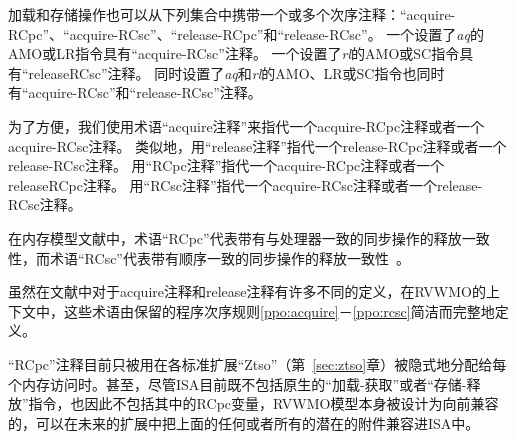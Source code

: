 加载和存储操作也可以从下列集合中携带一个或多个次序注释：“acquire-RCpc”、“acquire-RCsc”、“release-RCpc”和“release-RCsc”。
一个设置了{\em aq}的AMO或LR指令具有“acquire-RCsc”注释。
一个设置了{\em rl}的AMO或SC指令具有“releaseRCsc”注释。
同时设置了{\em aq}和{\em rl}的AMO、LR或SC指令也同时有“acquire-RCsc”和“release-RCsc”注释。

为了方便，我们使用术语“acquire注释”来指代一个acquire-RCpc注释或者一个acquire-RCsc注释。
类似地，用“release注释”指代一个release-RCpc注释或者一个release-RCsc注释。
用“RCpc注释”指代一个acquire-RCpc注释或者一个releaseRCpc注释。
用“RCsc注释”指代一个acquire-RCsc注释或者一个release-RCsc注释。

\begin{commentary}
  在内存模型文献中，术语“RCpc”代表带有与处理器一致的同步操作的释放一致性，而术语“RCsc”代表带有顺序一致的同步操作的释放一致性~\cite{Gharachorloo90memoryconsistency}。

  虽然在文献中对于acquire注释和release注释有许多不同的定义，在RVWMO的上下文中，这些术语由保留的程序次序规则\ref{ppo:acquire}－\ref{ppo:rcsc}简洁而完整地定义。

  “RCpc”注释目前只被用在各标准扩展“Ztso”（第~\ref{sec:ztso}章）被隐式地分配给每个内存访问时。甚至，尽管ISA目前既不包括原生的“加载-获取”或者“存储-释放”指令，也因此不包括其中的RCpc变量，RVWMO模型本身被设计为向前兼容的，可以在未来的扩展中把上面的任何或者所有的潜在的附件兼容进ISA中。
\end{commentary}

